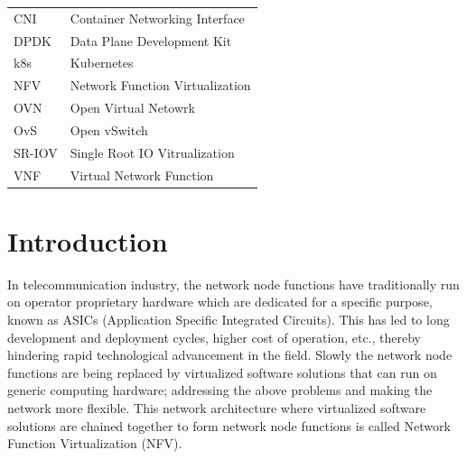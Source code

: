 \documentclass[english, 12pt, a4paper, elec, utf8, a-1b, online]{aaltothesis}
\begin{document}
\thesistableofcontents


\begin{tabular}{ll}
CNI         & Container Networking Interface \\
DPDK        & Data Plane Development Kit \\
k8s         & Kubernetes \\
NFV         & Network Function Virtualization \\
OVN         & Open Virtual Netowrk \\
OvS         & Open vSwitch \\
SR-IOV      & Single Root IO Vitrualization \\
VNF         & Virtual Network Function \\
\end{tabular}


\cleardoublepage

\section{Introduction}

\thispagestyle{empty}
In telecommunication industry, the network node functions have traditionally run on operator proprietary hardware which are dedicated for a specific purpose, known as ASICs (Application Specific Integrated Circuits). This has led to long development and deployment cycles, higher cost of operation, etc., thereby hindering rapid technological advancement in the field. Slowly the network node functions are being replaced by virtualized software solutions that can run on generic computing hardware; addressing the above problems and making the network more flexible. This network architecture where virtualized software solutions are chained together to form network node functions is called Network Function Virtualization (NFV).
\end{document}
